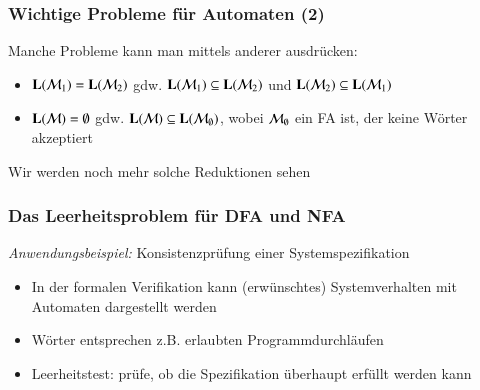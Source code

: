 \documentclass[onlymath]{beamer}
\begin{document}
\begin{frame}\frametitle{Wichtige Probleme für Automaten (2)}



\pause

Manche Probleme kann man mittels anderer ausdrücken:
\begin{itemize}
\item $\textbf{\textcolor{black}{L}}(\mathcal{M}_1)=\textbf{\textcolor{black}{L}}(\mathcal{M}_2)$ gdw. $\textbf{\textcolor{black}{L}}(\mathcal{M}_1)\subseteq\textbf{\textcolor{black}{L}}(\mathcal{M}_2)$ und $\textbf{\textcolor{black}{L}}(\mathcal{M}_2)\subseteq\textbf{\textcolor{black}{L}}(\mathcal{M}_1)$
\item $\textbf{\textcolor{black}{L}}(\mathcal{M})=\emptyset$ gdw. $\textbf{\textcolor{black}{L}}(\mathcal{M})\subseteq\textbf{\textcolor{black}{L}}(\mathcal{M}_\emptyset)$, wobei 
$\mathcal{M}_\emptyset$ ein FA ist, der keine Wörter akzeptiert
\end{itemize}
Wir werden noch mehr solche \alert{Reduktionen} sehen

\end{frame}

\begin{frame}\frametitle{Das Leerheitsproblem für DFA und NFA}


\emph{Anwendungsbeispiel:}
Konsistenzprüfung einer Systemspezifikation
\begin{itemize}
\item In der formalen Verifikation kann (erwünschtes) Systemverhalten mit Automaten dargestellt werden
\item Wörter entsprechen z.B. erlaubten Programmdurchläufen
\item Leerheitstest: prüfe, ob die Spezifikation überhaupt erfüllt werden kann
\end{itemize}

\end{frame}
\end{document}
